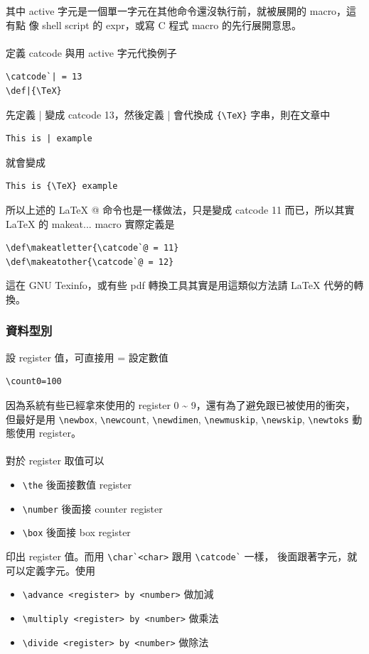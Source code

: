   其中 active 字元是一個單一字元在其他命令還沒執行前，就被展開的 macro，這有點
  像 shell script 的 expr，或寫 C 程式 macro 的先行展開意思。
  \\\\
  定義 catcode 與用 active 字元代換例子
  \begin{verbatim}
\catcode`| = 13
\def|{\TeX}
  \end{verbatim}
  先定義 | 變成 catcode 13，然後定義 | 會代換成 \verb={\TeX}= 字串，則在文章中
  \begin{verbatim}
This is | example
  \end{verbatim}
  就會變成
  \begin{verbatim}
This is {\TeX} example
  \end{verbatim}
  所以上述的 \LaTeX{} @ 命令也是一樣做法，只是變成 catcode 11 而已，所以其實
  \LaTeX{} 的 makeat... macro 實際定義是
  \begin{verbatim}
\def\makeatletter{\catcode`@ = 11}
\def\makeatother{\catcode`@ = 12}
  \end{verbatim}
  這在 GNU Texinfo，或有些 pdf 轉換工具其實是用這類似方法請 \LaTeX{} 代勞的轉
  換。

    \subsubsection{資料型別}
    設 register 值，可直接用 = 設定數值
    \begin{verbatim}
\count0=100
    \end{verbatim}
    因為系統有些已經拿來使用的 register 0 \~{} 9，還有為了避免跟已被使用的衝突，
    但最好是用 \verb=\newbox=, \verb=\newcount=, \verb=\newdimen=,
    \verb=\newmuskip=, \verb=\newskip=, \verb=\newtoks= 動態使用 register。
    \\\\
    對於 register 取值可以
    \begin{itemize}
      \item \verb=\the= 後面接數值 register
      \item \verb=\number= 後面接 counter register
      \item \verb=\box= 後面接 box register
    \end{itemize}
    印出 register 值。而用 \verb=\char`<char>= 跟用 \verb=\catcode`= 一樣，
    後面跟著字元，就可以定義字元。使用
    \begin{itemize}
      \item \verb=\advance <register> by <number>= 做加減
      \item \verb=\multiply <register> by <number>= 做乘法
      \item \verb=\divide <register> by <number>= 做除法
    \end{itemize}


